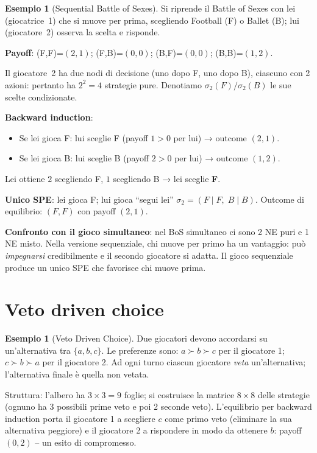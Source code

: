 \documentclass[12pt,a4paper,twoside]{book}
\theoremstyle{plain}
\theoremstyle{definition}
\newtheorem{example}[theorem]{Esempio}
\begin{document}
\begin{example}[Sequential Battle of Sexes]
Si riprende il Battle of Sexes con lei (giocatrice~1) che si muove per prima, scegliendo Football (F) o Ballet (B); lui (giocatore~2) osserva la scelta e risponde.

\textbf{Payoff}: (F,F)=$(2,1)$; (F,B)=$(0,0)$; (B,F)=$(0,0)$; (B,B)=$(1,2)$.

Il giocatore~2 ha due nodi di decisione (uno dopo F, uno dopo B), ciascuno con 2 azioni: pertanto ha $2^2=4$ strategie pure. Denotiamo $\sigma_2(F)/\sigma_2(B)$ le sue scelte condizionate.

\textbf{Backward induction}:
\begin{itemize}
  \item Se lei gioca F: lui sceglie F (payoff $1>0$ per lui) → outcome $(2,1)$.
  \item Se lei gioca B: lui sceglie B (payoff $2>0$ per lui) → outcome $(1,2)$.
\end{itemize}
Lei ottiene $2$ scegliendo F, $1$ scegliendo B → lei sceglie \textbf{F}.

\textbf{Unico SPE}: lei gioca F; lui gioca ``segui lei'' $\sigma_2=(F\mid F,\; B\mid B)$. Outcome di equilibrio: $(F,F)$ con payoff $(2,1)$.

\textbf{Confronto con il gioco simultaneo}: nel BoS simultaneo ci sono 2 NE puri e 1 NE misto. Nella versione sequenziale, chi muove per primo ha un vantaggio: può \emph{impegnarsi} credibilmente e il secondo giocatore si adatta. Il gioco sequenziale produce un unico SPE che favorisce chi muove prima.
\end{example}

\section{Veto driven choice}

\begin{example}[Veto Driven Choice]
Due giocatori devono accordarsi su un'alternativa tra $\{a,b,c\}$. Le preferenze sono: $a\succ b\succ c$ per il giocatore 1; $c\succ b\succ a$ per il giocatore 2. Ad ogni turno ciascun giocatore \emph{veta} un'alternativa; l'alternativa finale è quella non vetata.

Struttura: l'albero ha $3\times 3 = 9$ foglie; si costruisce la matrice $8\times 8$ delle strategie (ognuno ha 3 possibili prime veto e poi 2 seconde veto). L'equilibrio per backward induction porta il giocatore 1 a scegliere $c$ come primo veto (eliminare la sua alternativa peggiore) e il giocatore 2 a rispondere in modo da ottenere $b$: payoff $(0,2)$ -- un esito di compromesso.
\end{example}
\end{document}
